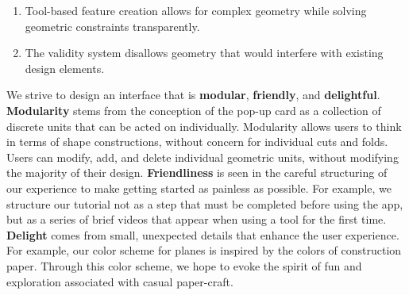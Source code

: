 \begin{enumerate}
\def\labelenumi{\arabic{enumi})}
\itemsep1pt\parskip0pt
\item
  Tool-based feature creation allows for complex geometry while solving
  geometric constraints transparently.
\item
  The validity system disallows geometry that would interfere with
  existing design elements.
\end{enumerate}

We strive to design an interface that is \textbf{modular},
\textbf{friendly}, and \textbf{delightful}. \textbf{Modularity} stems
from the conception of the pop-up card as a collection of discrete units
that can be acted on individually. Modularity allows users to think in
terms of shape constructions, without concern for individual cuts and
folds. Users can modify, add, and delete individual geometric units,
without modifying the majority of their design. \textbf{Friendliness} is
seen in the careful structuring of our experience to make getting
started as painless as possible. For example, we structure our tutorial
not as a step that must be completed before using the app, but as a
series of brief videos that appear when using a tool for the first time.
\textbf{Delight} comes from small, unexpected details that enhance the
user experience. For example, our color scheme for planes is inspired by
the colors of construction paper. Through this color scheme, we hope to
evoke the spirit of fun and exploration associated with casual
paper-craft.
